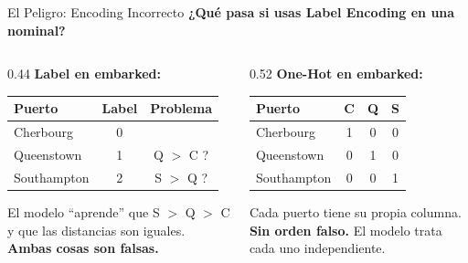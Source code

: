 \documentclass[aspectratio=169, 11pt]{beamer}
\begin{document}
\begin{frame}[shrink=5]{El Peligro: Encoding Incorrecto}
  \vspace{-4pt}
  {\footnotesize\color{arcaDark}\bfseries
    ¿Qué pasa si usas Label Encoding en una nominal?}

  \vspace{4pt}
  \begin{columns}[T]
    \begin{column}{0.44\textwidth}
      {\scriptsize\color{arcaRed}\bfseries\faTimesCircle\hspace{4pt}
        Label en embarked:}
      \vspace{4pt}

      {\scriptsize
      \begin{tabular}{@{}lcc@{}}
        \toprule
        \textbf{Puerto} & \textbf{Label} & \textbf{Problema} \\
        \midrule
        Cherbourg & 0 & \\
        Queenstown & 1 & Q $>$ C ? \\
        Southampton & 2 & S $>$ Q ? \\
        \bottomrule
      \end{tabular}
      }

      \vspace{4pt}
      {\scriptsize
      El modelo ``aprende'' que S $>$ Q $>$ C
      y que las distancias son iguales.
      \textbf{Ambas cosas son falsas.}
      }
    \end{column}

    \begin{column}{0.52\textwidth}
      {\scriptsize\color{codeGreen}\bfseries\faCheckCircle\hspace{4pt}
        One-Hot en embarked:}
      \vspace{4pt}

      {\scriptsize
      \begin{tabular}{@{}lccc@{}}
        \toprule
        \textbf{Puerto} & \textbf{C} & \textbf{Q} & \textbf{S} \\
        \midrule
        Cherbourg & 1 & 0 & 0 \\
        Queenstown & 0 & 1 & 0 \\
        Southampton & 0 & 0 & 1 \\
        \bottomrule
      \end{tabular}
      }

      \vspace{4pt}
      {\scriptsize
      Cada puerto tiene su propia columna.
      \textbf{Sin orden falso.}
      El modelo trata cada uno independiente.
      }
    \end{column}
  \end{columns}
\end{frame}
\end{document}
